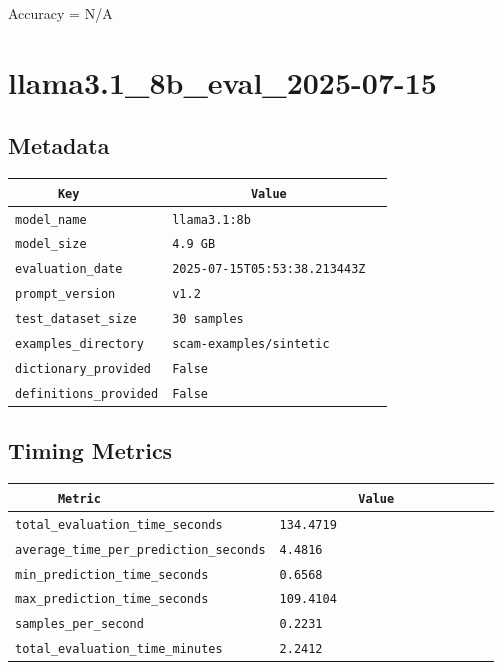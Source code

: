 \documentclass{article}
\begin{document}
\begin{center}
Accuracy = N/A
\end{center}

\section{llama3.1\_8b\_eval\_2025-07-15}
\subsection{Metadata}

\begin{center}
\begin{tabular}{l | l} \hline
    \verb|      Key      | & \verb|           Value           | \\ \hline
    \hline
    \verb|model_name    | & \verb|llama3.1:8b                  | \\ \hline
    \verb|model_size    | & \verb|4.9 GB                       | \\ \hline
    \verb|evaluation_date| & \verb|2025-07-15T05:53:38.213443Z  | \\ \hline
    \verb|prompt_version| & \verb|v1.2                         | \\ \hline
    \verb|test_dataset_size| & \verb|30 samples                   | \\ \hline
    \verb|examples_directory| & \verb|scam-examples/sintetic       | \\ \hline
    \verb|dictionary_provided| & \verb|False                        | \\ \hline
    \verb|definitions_provided| & \verb|False                        | \\ \hline
\end{tabular}
\end{center}

\subsection{Timing Metrics}

\begin{center}
\begin{tabular}{l | l} \hline
    \verb|      Metric     | & \verb|           Value           | \\ \hline
    \hline
    \verb|total_evaluation_time_seconds| & \verb|134.4719                     | \\ \hline
    \verb|average_time_per_prediction_seconds| & \verb|4.4816                       | \\ \hline
    \verb|min_prediction_time_seconds| & \verb|0.6568                       | \\ \hline
    \verb|max_prediction_time_seconds| & \verb|109.4104                     | \\ \hline
    \verb|samples_per_second| & \verb|0.2231                       | \\ \hline
    \verb|total_evaluation_time_minutes| & \verb|2.2412                       | \\ \hline
\end{tabular}
\end{center}
\end{document}
